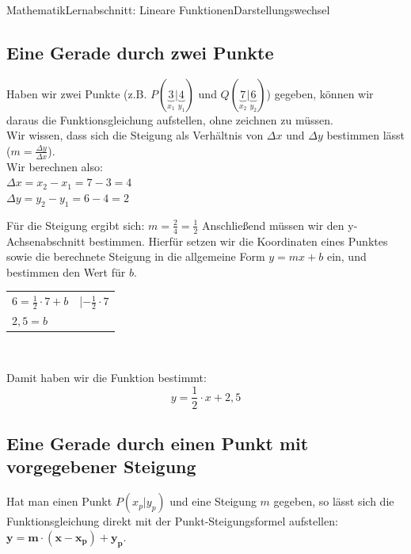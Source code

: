 \documentclass[11pt,twocolumn,oneside,openany,headings=optiontotoc,11pt,numbers=noenddot]{article}
\begin{document}
\begin{worksheet}{Mathematik}{Lernabschnitt: Lineare Funktionen}{Darstellungswechsel}
		\subsection{Eine Gerade durch zwei Punkte}
		Haben wir zwei Punkte (z.B. \(P(\underbrace{3}_{x_1}|\underbrace{4}_{y_1})\) und \(Q(\underbrace{7}_{x_2}|\underbrace{6}_{y_2})\)) gegeben, können wir daraus die Funktionsgleichung aufstellen, ohne zeichnen zu müssen.\\
		Wir wissen, dass sich die Steigung als Verhältnis von \(\Delta{}x\) und \(\Delta{}y\) bestimmen lässt (\(m = \frac{\Delta{}y}{\Delta{}x}\)).\\
		Wir berechnen also:\\
		\(\Delta{}x = x_2-x_1 = 7-3 = 4\)\\
		\(\Delta{}y = y_2-y_1 = 6-4 = 2\)\\
		\par\noindent
		Für die Steigung ergibt sich: \(m =\frac{2}{4} = \frac{1}{2}\)
		Anschließend müssen wir den y-Achsenabschnitt bestimmen. Hierfür setzen wir die Koordinaten eines Punktes sowie die berechnete Steigung in die allgemeine Form \(y = mx +b\) ein, und bestimmen den Wert für \(b\).\\
		\par\noindent
		\begin{tabularx}{0.48\textwidth}{ll}
			\(6 = \frac{1}{2}\cdot{}7 + b\) & |\(-\frac{1}{2}\cdot{}7\)\\
			\(2,5 = b\)
		\end{tabularx}\\
		\par\noindent
		Damit haben wir die Funktion bestimmt:
		\[y = \frac{1}{2}\cdot{}x + 2,5\]
		\subsection{Eine Gerade durch einen Punkt mit vorgegebener Steigung}
		Hat man einen Punkt \(P(x_p|y_p)\) und eine Steigung \(m\) gegeben, so lässt sich die Funktionsgleichung direkt mit der Punkt-Steigungsformel aufstellen: \(\mathbf{y=m\cdot{}(x-x_p) + y_p}\).\\

\end{worksheet}
\end{document}
